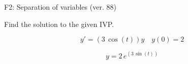 \begin{exercise}
  \begin{exerciseTitle}F2: Separation of variables (ver. 88)\end{exerciseTitle}
  \begin{exerciseStatement}
    
Find the solution to the given IVP.

    
\[y'=( 3 \, \cos\left(t\right) )y\hspace{1em} y(0)= 2\]

  \end{exerciseStatement}
  \begin{exerciseAnswer}
    
\[y= 2 \, e^{\left(3 \, \sin\left(t\right)\right)}\]

  \end{exerciseAnswer}
\end{exercise}